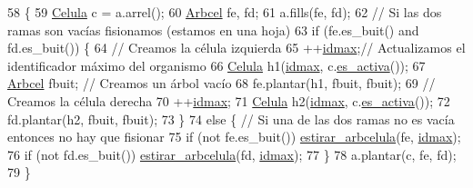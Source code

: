 \begin{DoxyCode}
58                                                      \{
59     \hyperlink{class_celula}{Celula} c = a.arrel();
60     \hyperlink{class_organismo_a6d28459b85f211994ba446ba304fa141}{Arbcel} fe, fd;
61     a.fills(fe, fd);
62     \textcolor{comment}{// Si las dos ramas son vacías fisionamos (estamos en una hoja)}
63     \textcolor{keywordflow}{if} (fe.es\_buit() and fd.es\_buit()) \{
64         \textcolor{comment}{// Creamos la célula izquierda}
65         ++\hyperlink{class_organismo_ae64c038f5e9a19d5c7d858a2b0fb58ee}{idmax};\textcolor{comment}{// Actualizamos el identificador máximo del organismo}
66         \hyperlink{class_celula}{Celula} h1(\hyperlink{class_organismo_ae64c038f5e9a19d5c7d858a2b0fb58ee}{idmax}, c.\hyperlink{class_celula_a25bbae8df2eb0b60202829321175e3f7}{es\_activa}());
67         \hyperlink{class_organismo_a6d28459b85f211994ba446ba304fa141}{Arbcel} fbuit; \textcolor{comment}{// Creamos un árbol vacío}
68         fe.plantar(h1, fbuit, fbuit);
69         \textcolor{comment}{// Creamos la célula derecha}
70         ++\hyperlink{class_organismo_ae64c038f5e9a19d5c7d858a2b0fb58ee}{idmax};
71         \hyperlink{class_celula}{Celula} h2(\hyperlink{class_organismo_ae64c038f5e9a19d5c7d858a2b0fb58ee}{idmax}, c.\hyperlink{class_celula_a25bbae8df2eb0b60202829321175e3f7}{es\_activa}());
72         fd.plantar(h2, fbuit, fbuit);
73     \}
74     \textcolor{keywordflow}{else} \{ \textcolor{comment}{// Si una de las dos ramas no es vacía entonces no hay que fisionar}
75         \textcolor{keywordflow}{if} (not fe.es\_buit()) \hyperlink{class_organismo_af2228bd5b25c4ca5924d30f075cb13fc}{estirar\_arbcelula}(fe, \hyperlink{class_organismo_ae64c038f5e9a19d5c7d858a2b0fb58ee}{idmax});
76         \textcolor{keywordflow}{if} (not fd.es\_buit()) \hyperlink{class_organismo_af2228bd5b25c4ca5924d30f075cb13fc}{estirar\_arbcelula}(fd, \hyperlink{class_organismo_ae64c038f5e9a19d5c7d858a2b0fb58ee}{idmax});
77     \}
78     a.plantar(c, fe, fd);
79 \}
\end{DoxyCode}
